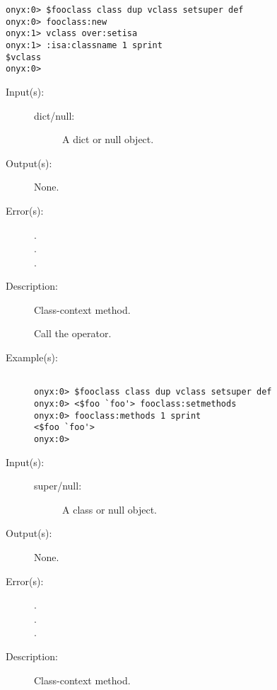\begin{description}
\begin{description}
\begin{verbatim}
onyx:0> $fooclass class dup vclass setsuper def
onyx:0> fooclass:new
onyx:1> vclass over:setisa
onyx:1> :isa:classname 1 sprint
$vclass
onyx:0>
		\end{verbatim}
	\end{description}
\label{vclass:setmethods}
\item[{\onyxop{dict/null}{setmethods}{--}}: ]
	\begin{description}\item[]
	\item[Input(s): ]
		\begin{description}\item[]
		\item[dict/null: ]
			A dict or null object.
		\end{description}
	\item[Output(s): ] None.
	\item[Error(s): ]
		\begin{description}\item[]
		\item[.]
		\item[.]
		\item[.]
		\end{description}
	\item[Description: ]
		Class-context method.

		Call the
		operator.
	\item[Example(s): ]\begin{verbatim}

onyx:0> $fooclass class dup vclass setsuper def
onyx:0> <$foo `foo'> fooclass:setmethods
onyx:0> fooclass:methods 1 sprint
<$foo `foo'>
onyx:0>
		\end{verbatim}
	\end{description}
\label{vclass:setsuper}
\item[{\onyxop{super/null}{setsuper}{--}}: ]
	\begin{description}\item[]
	\item[Input(s): ]
		\begin{description}\item[]
		\item[super/null: ]
			A class or null object.
		\end{description}
	\item[Output(s): ] None.
	\item[Error(s): ]
		\begin{description}\item[]
		\item[.]
		\item[.]
		\item[.]
		\end{description}
	\item[Description: ]
		Class-context method.


\end{description}
\end{description}
